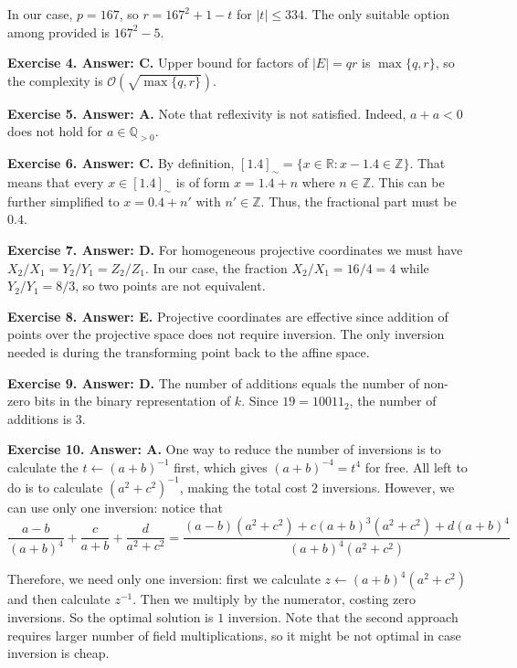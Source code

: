 \documentclass[../lecture-notes-148x210.tex]{subfiles}
\begin{document}
In our case, $p=167$, so $r=167^2 + 1 - t$ for $|t| \leq 334$. The only 
suitable option among provided is $167^2 - 5$.

\textbf{Exercise 4. Answer: C.} Upper bound for factors of $|E|=qr$ is
$\max\{q,r\}$, so the complexity is $\mathcal{O}(\sqrt{\max\{q,r\}})$.

\textbf{Exercise 5. Answer: A.} Note that reflexivity is not satisfied. Indeed,
$a+a<0$ does not hold for $a \in \mathbb{Q}_{>0}$.

\textbf{Exercise 6. Answer: C.} By definition, $[1.4]_{\sim} = \{x \in \mathbb{R}: x-1.4 \in \mathbb{Z}\}$. That means 
that every $x \in [1.4]_{\sim}$ is of form $x=1.4+n$ where $n \in \mathbb{Z}$. This can be 
further simplified to $x=0.4 + n'$ with $n' \in \mathbb{Z}$. Thus, the fractional part 
must be $0.4$.

\textbf{Exercise 7. Answer: D.} For homogeneous projective coordinates we must
have $X_2/X_1=Y_2/Y_1=Z_2/Z_1$. In our case, the fraction $X_2/X_1=16/4=4$ while
$Y_2/Y_1=8/3$, so two points are not equivalent.

\textbf{Exercise 8. Answer: E.} Projective coordinates are effective since 
addition of points over the projective space does not require inversion. The 
only inversion needed is during the transforming point back to the affine space.

\textbf{Exercise 9. Answer: D.} The number of additions equals the number of 
non-zero bits in the binary representation of $k$. Since $19=10011_2$, the number
of additions is $3$.

\textbf{Exercise 10. Answer: A.} One way to reduce the number of inversions 
is to calculate the $t \gets (a+b)^{-1}$ first, which gives $(a+b)^{-4}=t^4$
for free. All left to do is to calculate $(a^2+c^2)^{-1}$, making the 
total cost $2$ inversions. However, we can use only one inversion: notice 
that
\begin{equation*}
    \frac{a-b}{(a+b)^4} + \frac{c}{a+b} + \frac{d}{a^2+c^2} = \frac{(a-b)(a^2+c^2) + c(a+b)^3(a^2+c^2) + d(a+b)^4}{(a+b)^4(a^2+c^2)}
\end{equation*}

Therefore, we need only one inversion: first we calculate $z \gets (a+b)^4(a^2+c^2)$ and then calculate $z^{-1}$. Then we multiply 
by the numerator, costing zero inversions. So the optimal solution is $1$ inversion. Note that the second approach 
requires larger number of field multiplications, so it might be not optimal in case inversion is cheap.
\end{document}
